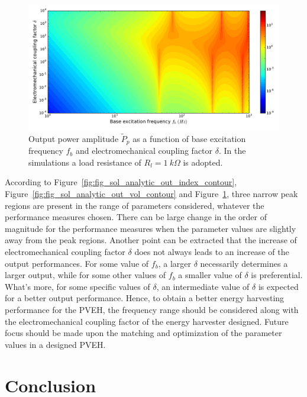 \documentclass{article}
\begin{document}
\begin{figure}[!htbp]
    \centering
    \includegraphics[width=\textwidth]{./img_eig_asy/fig_sol_analytic_out_pow_contour}
    \caption{ Output power amplitude $\tilde{P}_p$ as a function of base excitation frequency $f_b$ and electromechanical coupling factor $\delta$. In the simulations a load resistance of $R_l = 1\ k\Omega$ is adopted.}
    \label{fig:fig_sol_analytic_out_pow_contour}
\end{figure}


According to Figure~\ref{fig:fig_sol_analytic_out_index_contour}, Figure~\ref{fig:fig_sol_analytic_out_vol_contour} and Figure~\ref{fig:fig_sol_analytic_out_pow_contour}, three narrow peak regions are present in the range of parameters considered, whatever the performance measures chosen. There can be large change in the order of magnitude for the performance measures when the parameter values are slightly away from the peak regions. Another point can be extracted that the increase of electromechanical coupling factor $\delta$ does not always leads to an increase of the output performances. For some value of $f_b$, a larger $\delta$ necessarily determines a larger output, while for some other values of $f_b$ a smaller value of $\delta$ is preferential. What's more, for some specific values of $\delta$, an intermediate value of $\delta$ is expected for a better output performance. Hence, to obtain a better energy harvesting performance for the PVEH, the frequency range should be considered along with the electromechanical coupling factor of the energy harvester designed. Future focus should be made upon the matching and optimization of the parameter values in a designed PVEH.


\section{Conclusion}
\end{document}
